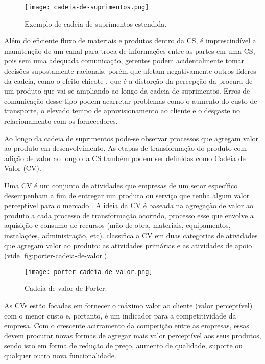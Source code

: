 \begin{figure}[htb]
	\centering
	\texttt{[image: cadeia-de-suprimentos.png]}
	\caption{Exemplo de cadeia de suprimentos estendida.}
	\label{fig:cadeia-de-suprimentos}
\end{figure}

Além do eficiente fluxo de materiais e produtos dentro da CS, é imprescindível a manutenção de um canal para troca de informações entre as partes em uma CS, pois sem uma adequada comunicação, gerentes podem acidentalmente tomar decisões supostamente racionais, porém que afetam negativamente outros líderes da cadeia, como o efeito chicote \cite{lee1997bullwhip}, que é a distorção da percepção da procura de um produto que vai se ampliando ao longo da cadeia de suprimentos. Erros de comunicação desse tipo podem acarretar problemas como o aumento do custo de transporte, o elevado tempo de aprovisionamento ao cliente e o desgaste no relacionamento com os fornecedores.

Ao longo da cadeia de suprimentos pode-se observar processos que agregam valor ao produto em desenvolvimento. As etapas de transformação do produto com adição de valor ao longo da CS também podem ser definidas como Cadeia de Valor (CV).

Uma CV é um conjunto de atividades que empresas de um setor específico desempenham a fim de entregar um produto ou serviço que tenha algum valor perceptível para o mercado \cite{porter1985competitiveadvantage}. A ideia da CV é baseada na agregação de valor ao produto a cada processo de transformação ocorrido, processo esse que envolve a aquisição e consumo de recursos (mão de obra, materiais, equipamentos, instalações, administração, etc).  classifica a CV em duas categorias de atividades que agregam valor ao produto: as atividades primárias e as atividades de apoio (vide \autoref{fig:porter-cadeia-de-valor}).

\begin{figure}[htb]
	\centering
	\texttt{[image: porter-cadeia-de-valor.png]}
	\caption{Cadeia de valor de Porter.}
	\label{fig:porter-cadeia-de-valor}
\end{figure}

As CVs estão focadas em fornecer o máximo valor ao cliente (valor perceptível) com o menor custo e, portanto, é um indicador para a competitividade da empresa. Com o crescente acirramento da competição entre as empresas, essas devem procurar novas formas de agregar mais valor perceptível aos seus produtos, sendo isto em forma de redução de preço, aumento de qualidade, suporte ou qualquer outra nova funcionalidade.

